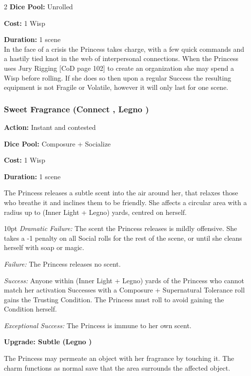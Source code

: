 \begin{multicols}{2}
\noindent \textbf{Dice Pool:} Unrolled

\noindent \textbf{Cost:} 1 Wisp

\noindent \textbf{Duration:} 1 scene \\

In the face of a crisis the Princess takes charge, with a few quick commands and a hastily tied knot in the web of interpersonal connections. When the Princess uses Jury Rigging [CoD page 102] to create an organization she may spend a Wisp before rolling. If she does so then upon a regular Success the resulting equipment is not Fragile or Volatile, however it will only last for one scene. 

\subsubsection*{Sweet Fragrance (Connect \textbullet, Legno \textbullet)}

\noindent \textbf{Action:} Instant and contested

\noindent \textbf{Dice Pool:} Composure + Socialize

\noindent \textbf{Cost:} 1 Wisp

\noindent \textbf{Duration:} 1 scene

The Princess releases a subtle scent into the air around her, that relaxes those who breathe it and inclines them to be friendly. She affects a circular area with a radius up to (Inner Light + Legno) yards, centred on
herself.

\begin{myindentpar}{10pt}    \emph{Dramatic Failure:} The scent the Princess releases is mildly offensive. She takes a -1 penalty on all Social rolls for the rest of the scene, or until she cleans herself with soap or magic.

    \emph{Failure:} The Princess releases no scent. 

    \emph{Success:} Anyone within (Inner Light + Legno) yards of the Princess who cannot match her activation Successes with a  Composure + Supernatural Tolerance roll gains the Trusting Condition. The Princess must roll to avoid gaining the Condition herself.

    \emph{Exceptional Success:} The Princess is immune to her own scent.
	
	\textbf{Upgrade: Subtle (Legno \textbullet\textbullet)}

	The Princess may permeate an object with her fragrance by touching it. The charm functions as normal save that the area surrounds the affected object.\end{myindentpar}


\end{multicols}

